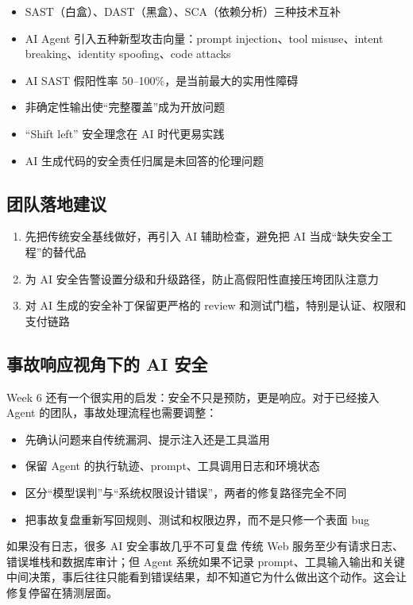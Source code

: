 \documentclass[a4paper]{article}
\begin{document}
\begin{itemize}
    \item SAST（白盒）、DAST（黑盒）、SCA（依赖分析）三种技术互补
    \item AI Agent 引入五种新型攻击向量：prompt injection、tool misuse、intent breaking、identity spoofing、code attacks
    \item AI SAST 假阳性率 50--100\%，是当前最大的实用性障碍
    \item 非确定性输出使``完整覆盖''成为开放问题
    \item ``Shift left'' 安全理念在 AI 时代更易实践
    \item AI 生成代码的安全责任归属是未回答的伦理问题
\end{itemize}

\subsection{团队落地建议}

\begin{enumerate}
    \item 先把传统安全基线做好，再引入 AI 辅助检查，避免把 AI 当成“缺失安全工程”的替代品
    \item 为 AI 安全告警设置分级和升级路径，防止高假阳性直接压垮团队注意力
    \item 对 AI 生成的安全补丁保留更严格的 review 和测试门槛，特别是认证、权限和支付链路
\end{enumerate}

\subsection{事故响应视角下的 AI 安全}

Week 6 还有一个很实用的启发：安全不只是预防，更是响应。对于已经接入 Agent 的团队，事故处理流程也需要调整：

\begin{itemize}
    \item 先确认问题来自传统漏洞、提示注入还是工具滥用
    \item 保留 Agent 的执行轨迹、prompt、工具调用日志和环境状态
    \item 区分“模型误判”与“系统权限设计错误”，两者的修复路径完全不同
    \item 把事故复盘重新写回规则、测试和权限边界，而不是只修一个表面 bug
\end{itemize}

\begin{warningbox}{如果没有日志，很多 AI 安全事故几乎不可复盘}
传统 Web 服务至少有请求日志、错误堆栈和数据库审计；但 Agent 系统如果不记录 prompt、工具输入输出和关键中间决策，事后往往只能看到错误结果，却不知道它为什么做出这个动作。这会让修复停留在猜测层面。
\end{warningbox}
\end{document}
